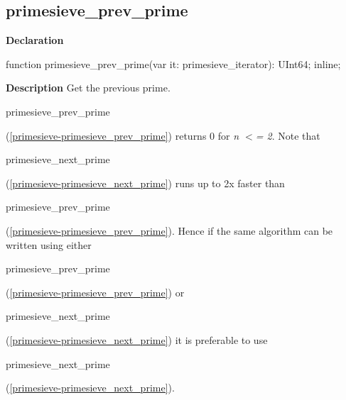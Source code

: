 \documentclass{report}
\newif\ifpdf
\begin{document}
\subsection*{primesieve{\_}prev{\_}prime}
\fi
\label{primesieve-primesieve_prev_prime}
\begin{list}{}{
\setlength{\itemindent}{0cm}
\setlength{\listparindent}{0cm}
\setlength{\leftmargin}{\evensidemargin}
\addtolength{\leftmargin}{\tmplength}
\settowidth{\labelsep}{X}
\addtolength{\leftmargin}{\labelsep}
\setlength{\labelwidth}{\tmplength}
}
\item[\textbf{Declaration}\hfill]
\ifpdf
\begin{flushleft}
\fi
\begin{ttfamily}
function primesieve{\_}prev{\_}prime(var it: primesieve{\_}iterator): UInt64; inline;\end{ttfamily}

\ifpdf
\end{flushleft}
\fi

\par
\item[\textbf{Description}]
Get the previous prime.

\begin{ttfamily}primesieve{\_}prev{\_}prime\end{ttfamily}(\ref{primesieve-primesieve_prev_prime}) returns 0 for \textit{n {$<$}= 2}. Note that \begin{ttfamily}primesieve{\_}next{\_}prime\end{ttfamily}(\ref{primesieve-primesieve_next_prime}) runs up to 2x faster than \begin{ttfamily}primesieve{\_}prev{\_}prime\end{ttfamily}(\ref{primesieve-primesieve_prev_prime}). Hence if the same algorithm can be written using either \begin{ttfamily}primesieve{\_}prev{\_}prime\end{ttfamily}(\ref{primesieve-primesieve_prev_prime}) or \begin{ttfamily}primesieve{\_}next{\_}prime\end{ttfamily}(\ref{primesieve-primesieve_next_prime}) it is preferable to use \begin{ttfamily}primesieve{\_}next{\_}prime\end{ttfamily}(\ref{primesieve-primesieve_next_prime}).

\end{list}
\end{document}

